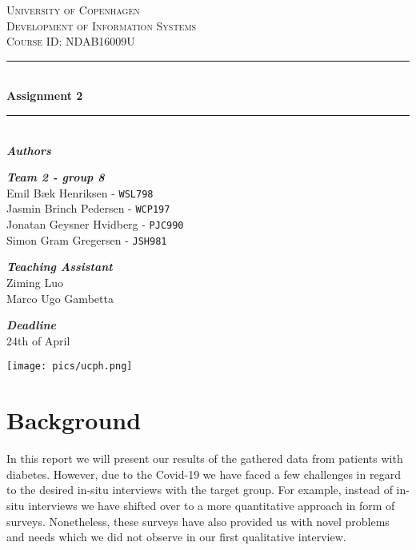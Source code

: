 \documentclass[a4paper,11pt]{article}
\begin{document}
\begin{titlepage}
    \newcommand{\HRule}{\rule{\linewidth}{0.5mm}}
    \center
    \textsc{\LARGE University of Copenhagen}\\[1.5cm]
    \textsc{\Large Development of Information Systems}\\[0.5cm]
    \textsc{Course ID: NDAB16009U}

    \vfill
    \HRule\\[0.4cm]
    {\huge\bfseries Assignment 2}\\[0.4cm]
    \HRule\\[1.5cm]

    \large\textit{\textbf{Authors}}
    
    \large\textit{\textbf{Team 2 -  group 8}}
    \\Emil Bæk Henriksen - \texttt{WSL798}
    \\Jasmin Brinch Pedersen - \texttt{WCP197}
    \\Jonatan Geysner Hvidberg - \texttt{PJC990}
    \\Simon Gram Gregersen - \texttt{JSH981}
    
    \vfill

    \large\textit{\textbf{Teaching Assistant}}
    \\Ziming Luo
    \\Marco Ugo Gambetta

    \vfill
    \large\textit{\textbf{Deadline}}
    \\24th of April
    \vfill

\texttt{[image: pics/ucph.png]}
\end{titlepage}


\newpage
\tableofcontents
\newpage
\section{Background}
In this report we will present our results of the gathered data from patients with diabetes. However, due to the Covid-19 we have faced a few challenges in regard to the desired in-situ interviews with the target group. For example, instead of in-situ interviews we have shifted over to a more quantitative approach in form of surveys. Nonetheless, these surveys have also provided us with novel problems and needs which we did not observe in our first qualitative interview.\\
\end{document}
